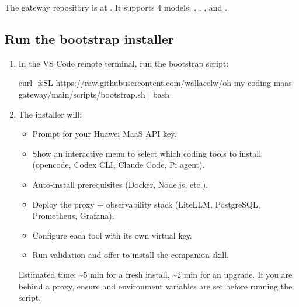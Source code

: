 \documentclass[english]{guide}
\begin{document}
\begin{infobox}
The gateway repository is at
.
It supports 4 models: , ,
, and .
\end{infobox}

\subsection{Run the bootstrap installer}


\passoapasso
\begin{enumerate}
  \item In the VS Code remote terminal, run the bootstrap script:

  \begin{codigo}[bash]
curl -fsSL https://raw.githubusercontent.com/wallacelw/oh-my-coding-maas-gateway/main/scripts/bootstrap.sh | bash
  \end{codigo}

  \item The installer will:
    \begin{itemize}
      \item Prompt for your Huawei MaaS API key.
      \item Show an interactive menu to select which coding tools to install
            (opencode, Codex CLI, Claude Code, Pi agent).
      \item Auto-install prerequisites (Docker, Node.js, etc.).
      \item Deploy the proxy + observability stack (LiteLLM, PostgreSQL,
            Prometheus, Grafana).
      \item Configure each tool with its own virtual key.
      \item Run validation and offer to install the companion skill.
    \end{itemize}


  \begin{aviso}
  Estimated time: \textasciitilde5 min for a fresh install, \textasciitilde2 min
  for an upgrade. If you are behind a proxy, ensure  and
   environment variables are set before running the script.
  \end{aviso}
\end{enumerate}
\end{document}
